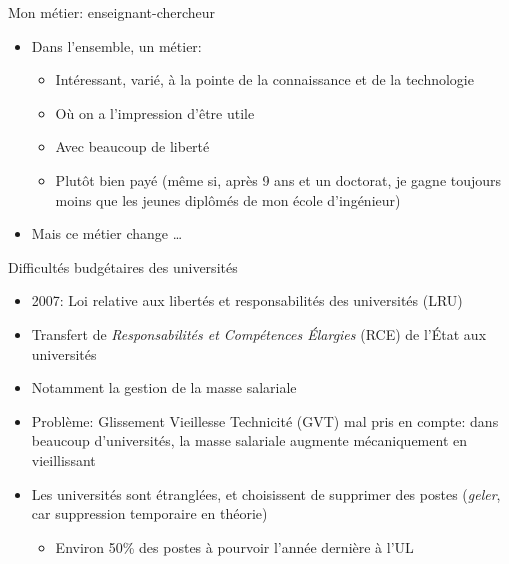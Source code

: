 \documentclass[10pt,final,usepdftitle=false]{beamer}
\begin{document}
\begin{frame}{Mon métier: enseignant-chercheur}
\begin{itemize}
\item Dans l'ensemble, un métier:
\begin{itemize}
\item Intéressant, varié, à la pointe de la connaissance et de la technologie
\smallskip
\item Où on a l'impression d'être utile
\smallskip
\item Avec beaucoup de liberté
\smallskip
\item Plutôt bien payé (même si, après 9 ans et un doctorat, je gagne toujours moins que les jeunes diplômés de mon école d'ingénieur)
\end{itemize}
\pause
\smallskip
\item Mais ce métier change \ldots
\end{itemize}
\end{frame}

\begin{frame}{Difficultés budgétaires des universités}
\begin{itemize}
\item 2007: Loi relative aux libertés et responsabilités des universités (LRU)
\smallskip
\item Transfert de \textsl{Responsabilités et Compétences Élargies} (RCE) de l'État aux universités
\smallskip
\item Notamment la gestion de la masse salariale
\smallskip
\item Problème: Glissement Vieillesse Technicité (GVT) mal pris en compte:
	dans beaucoup d'universités, la masse salariale augmente mécaniquement en vieillissant
\smallskip
\item Les universités sont étranglées, et choisissent de supprimer des postes (\textsl{geler}, car 
    suppression temporaire en théorie)
    \begin{itemize}
	\item Environ 50\% des postes à pourvoir l'année dernière à l'UL
	\end{itemize}
\end{itemize}
\end{frame}
\end{document}
